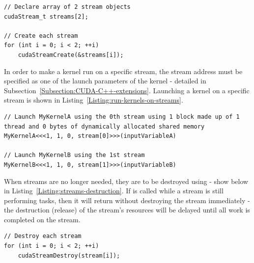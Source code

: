 \begin{lstlisting}[caption={Creation of streams. Taken from Nvidia's \emph{CUDA C++ Programming Guide} \cite{NVIDIAMay2022}.},label={Listing:streams-creation}]
// Declare array of 2 stream objects
cudaStream_t streams[2];

// Create each stream
for (int i = 0; i < 2; ++i)
	cudaStreamCreate(&streams[i]);
\end{lstlisting}

In order to make a kernel run on a specific stream, the stream address must be specified as one of the launch parameters of the kernel - detailed in Subsection~\ref{Subsection:CUDA-C++-extensions}. Launching a kernel on a specific stream is shown in Listing~\ref{Listing:run-kernels-on-streams}.

\begin{lstlisting}[caption={Pseudo-code for launching 2 different kernels using 2 different streams. The instructions in this example would be executed from the host. Since each kernel is essentially an open door to the device for instructions, then, once \code{MyKernelA} is launched on \code{stream[0]}, the control is returned to the host without waiting for \code{MyKernelA} to finish. Subsequently, the host will immediately launch \code{MyKernelB} using \code{stream[1]}. In this example, each kernel is launched on a grid made up of 1 single-thread block with 0 bytes of dynamic shared memory allocated, thus, the devic resources will not be exhausted and both kernels will run concurrently. Taken from Nvidia's \emph{CUDA C++ Programming Guide} \cite{NVIDIAMay2022}.},label={Listing:run-kernels-on-streams}]
// Launch MyKernelA using the 0th stream using 1 block made up of 1 thread and 0 bytes of dynamically allocated shared memory
MyKernelA<<<1, 1, 0, stream[0]>>>(inputVariableA)

// Launch MyKernelB using the 1st stream
MyKernelB<<<1, 1, 0, stream[1]>>>(inputVariableB)
\end{lstlisting}

When streams are no longer needed, they are to be destroyed using  - show below in Listing~\ref{Listing:streams-destruction}. If  is called while a stream is still performing tasks, then it will return without destroying the stream immediately - the destruction (release) of the stream's resources will be delayed until all work is completed on the stream.

\begin{lstlisting}[caption={Destruction of streams. Taken from Nvidia's \emph{CUDA C++ Programming Guide} \cite{NVIDIAMay2022}.},label={Listing:streams-destruction}]
// Destroy each stream
for (int i = 0; i < 2; ++i)
	cudaStreamDestroy(stream[i]);
\end{lstlisting}

